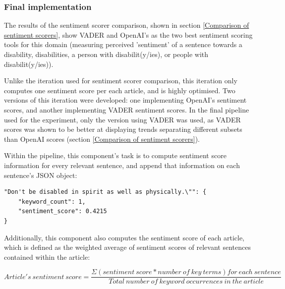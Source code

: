 \documentclass{report}
\begin{document}
\subsubsection{Final implementation} \label{des-sentiment-final}

The results of the sentiment scorer comparison, shown in section \ref{Comparison of sentiment scorers}, show VADER \cite{VADER} and OpenAI's \cite{OpenAI} as the two best sentiment scoring tools for this domain (measuring perceived 'sentiment' of a sentence towards a disability, disabilities, a person with disabilit(y/ies), or people with disabilit(y/ies)).

Unlike the iteration used for sentiment scorer comparison, this iteration only computes one sentiment score per each article, and is highly optimised.
Two versions of this iteration were developed: one implementing OpenAI's sentiment scores, and another implementing VADER sentiment scores.
In the final pipeline used for the experiment, only the version using VADER was used, as VADER scores was shown to be better at displaying trends separating different subsets than OpenAI scores (section \ref{Comparison of sentiment scorers}).

Within the pipeline, this component's task is to compute sentiment score information for every relevant sentence, and append that information on each sentence's JSON object:
\begin{lstlisting}
"Don't be disabled in spirit as well as physically.\"": {
	"keyword_count": 1,
	"sentiment_score": 0.4215
}
\end{lstlisting}
Additionally, this component also computes the sentiment score of each article, which is defined as the weighted average of sentiment scores of relevant sentences contained within the article:

\begin{center}
	$Article's \ sentiment \ score = \dfrac{\Sigma (sentiment \ score * number \ of \ key \ terms) for \ each \ sentence}{Total \ number \ of \ keyword \ occurrences \ in \ the \ article}$
\end{center}
\end{document}
